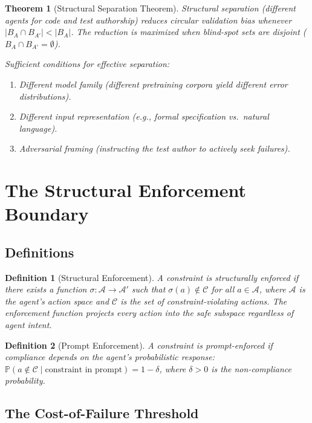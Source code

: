 \documentclass[11pt, a4paper, logo, copyright]{googledeepmind}
\newtheorem{definition}{Definition}[section]
\newtheorem{theorem}{Theorem}[section]
\newcommand{\Prob}{\mathbb{P}}
\newcommand{\calA}{\mathcal{A}}
\newcommand{\calC}{\mathcal{C}}
\begin{document}
\begin{theorem}[Structural Separation Theorem]
\label{thm:separation}
Structural separation (different agents for code and test authorship) reduces circular validation bias whenever $|B_A \cap B_{A'}| < |B_A|$.
The reduction is maximized when blind-spot sets are disjoint ($B_A \cap B_{A'} = \emptyset$).

\noindent Sufficient conditions for effective separation:
\begin{enumerate}
\item Different model family (different pretraining corpora yield different error distributions).
\item Different input representation (e.g., formal specification vs.\ natural language).
\item Adversarial framing (instructing the test author to actively seek failures).
\end{enumerate}
\end{theorem}

\section{The Structural Enforcement Boundary}
\label{sec:structural}

\subsection{Definitions}

\begin{definition}[Structural Enforcement]
A constraint is \emph{structurally enforced} if there exists a function $\sigma: \calA \to \calA'$ such that $\sigma(a) \notin \calC$ for all $a \in \calA$, where $\calA$ is the agent's action space and $\calC$ is the set of constraint-violating actions.
The enforcement function projects every action into the safe subspace regardless of agent intent.
\end{definition}

\begin{definition}[Prompt Enforcement]
A constraint is \emph{prompt-enforced} if compliance depends on the agent's probabilistic response:
$\Prob(a \notin \calC \mid \text{constraint in prompt}) = 1 - \delta$,
where $\delta > 0$ is the non-compliance probability.
\end{definition}

\subsection{The Cost-of-Failure Threshold}
\end{document}
